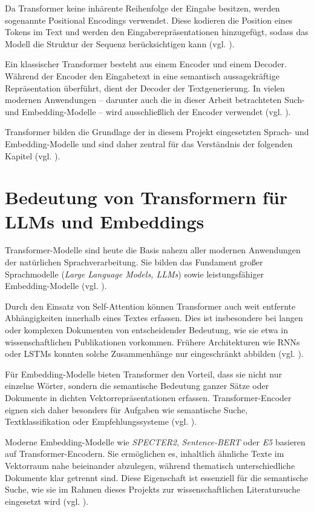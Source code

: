 Da Transformer keine inhärente Reihenfolge der Eingabe besitzen, werden sogenannte Positional Encodings verwendet. Diese kodieren die Position eines Tokens im Text und werden den Eingaberepräsentationen hinzugefügt, sodass das Modell die Struktur der Sequenz berücksichtigen kann (vgl. \cite{Attention-Is-All-You-Need}).

Ein klassischer Transformer besteht aus einem Encoder und einem Decoder. Während der Encoder den Eingabetext in eine semantisch aussagekräftige Repräsentation überführt, dient der Decoder der Textgenerierung. In vielen modernen Anwendungen – darunter auch die in dieser Arbeit betrachteten Such- und Embedding-Modelle – wird ausschließlich der Encoder verwendet (vgl. \cite{Attention-Is-All-You-Need}).

Transformer bilden die Grundlage der in diesem Projekt eingesetzten Sprach- und Embedding-Modelle und sind daher zentral für das Verständnis der folgenden Kapitel (vgl. \cite{Attention-Is-All-You-Need}).

\section{Bedeutung von Transformern für LLMs und Embeddings}

Transformer-Modelle sind heute die Basis nahezu aller modernen Anwendungen der natürlichen Sprachverarbeitung. Sie bilden das Fundament großer Sprachmodelle (\textit{Large Language Models, LLMs}) sowie leistungsfähiger Embedding-Modelle (vgl. \cite{Attention-Is-All-You-Need,brown2020language,touvron2023llama}).

Durch den Einsatz von Self-Attention können Transformer auch weit entfernte Abhängigkeiten innerhalb eines Textes erfassen. Dies ist insbesondere bei langen oder komplexen Dokumenten von entscheidender Bedeutung, wie sie etwa in wissenschaftlichen Publikationen vorkommen. Frühere Architekturen wie RNNs oder LSTMs konnten solche Zusammenhänge nur eingeschränkt abbilden (vgl. \cite{Attention-Is-All-You-Need}).

Für Embedding-Modelle bieten Transformer den Vorteil, dass sie nicht nur einzelne Wörter, sondern die semantische Bedeutung ganzer Sätze oder Dokumente in dichten Vektorrepräsentationen erfassen. Transformer-Encoder eignen sich daher besonders für Aufgaben wie semantische Suche, Textklassifikation oder Empfehlungssysteme (vgl. \cite{nandakumar2023specter2}).

Moderne Embedding-Modelle wie \textit{SPECTER2}, \textit{Sentence-BERT} oder \textit{E5} basieren auf Transformer-Encodern. Sie ermöglichen es, inhaltlich ähnliche Texte im Vektorraum nahe beieinander abzulegen, während thematisch unterschiedliche Dokumente klar getrennt sind. Diese Eigenschaft ist essenziell für die semantische Suche, wie sie im Rahmen dieses Projekts zur wissenschaftlichen Literatursuche eingesetzt wird (vgl. \cite{nandakumar2023specter2}).

